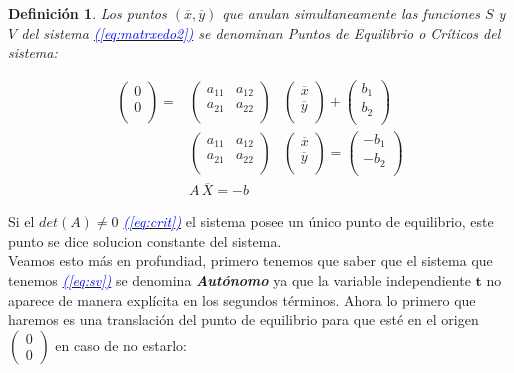 \documentclass[12pt,a4paper]{report} %
\newtheorem{definicion}{Definición} %
\newcommand{\eref}[1]{\hyperref[#1]{\textcolor{blue}{\textit{(\ref*{#1})}}}}
\begin{document}
	\begin{definicion}
		Los puntos $(\overline{x},\overline{y})$ que anulan simultaneamente las funciones $S$ y $V$ del sistema \eref{eq:matrxedo2} se denominan Puntos de Equilibrio o Críticos del sistema:
	\end{definicion}

	\begin{eqnarray}
		\label{eq:crit}
			\begin{pmatrix}
				0\\
				0\\
			\end{pmatrix} =
			&\begin{pmatrix}
				a_{11} & a_{12}\\
				a_{21} & a_{22}\\
			\end{pmatrix}&
			\begin{pmatrix}
				\overline{x}\\
				\overline{y}\\
			\end{pmatrix} + 
			\begin{pmatrix}
				b_1\\
				b_2\\
			\end{pmatrix}\nonumber \\[4mm]
			&\begin{pmatrix}
			a_{11} & a_{12}\\
			a_{21} & a_{22}\\
			\end{pmatrix}&
			\begin{pmatrix}
			\overline{x}\\
			\overline{y}\\
			\end{pmatrix} = 
			\begin{pmatrix}
			-b_1\\
			-b_2\\
			\end{pmatrix} \nonumber \\[4mm]
			&A\,\overline{X}=-b
	\end{eqnarray}\smallskip
	
	Si el $det(A)\neq0$ \eref{eq:crit} el sistema posee un único punto de equilibrio, este punto se dice solucion constante del sistema.
    \\[0.5cm]
    Veamos esto más en profundiad, primero tenemos que saber que el sistema que tenemos \eref{eq:sv} se denomina \textit{\textbf{Autónomo}} ya que la variable independiente $\bm{t}$ no aparece de manera explícita en los segundos términos.
    \newpage
    Ahora lo primero que haremos es una translación del punto de equilibrio para que esté en el origen $\begin{pmatrix} 0 \\ 0
    \end{pmatrix}$ en caso de no estarlo:
    
\end{document}
